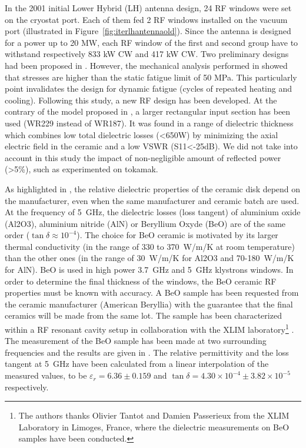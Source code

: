 In the 2001 initial Lower Hybrid (LH) antenna design, 24 RF windows were set on the cryostat port. Each of them fed 2 RF windows installed on the vacuum port (illustrated in Figure~\ref{fig:iterlhantennaold}). Since the antenna is designed for a power up to 20 MW, each RF window of the first and second group have to withstand respectively 833 kW CW and 417 kW CW. Two preliminary designs had been proposed in . However, the mechanical analysis performed in  showed that stresses are higher than the static fatigue limit of 50 MPa. This particularly point invalidates the design for dynamic fatigue (cycles of repeated heating and cooling). Following this study, a new RF design has been developed. At the contrary of the model proposed in \cite{bibet2001-1}, a larger rectangular input section has been used (WR229 instead of WR187). It was found in  a range of dielectric thickness which combines low total dielectric losses (<650W) by minimizing the axial electric field in the ceramic and a low VSWR (S11<-25dB). We did not take into account in this study the impact of non-negligible amount of reflected power (>5\%), such as experimented on tokamak.

As highlighted in , the relative dielectric properties of the ceramic disk depend on the manufacturer, even when the same manufacturer and ceramic batch are used. At the frequency of 5~GHz, the dielectric losses (loss tangent) of aluminium oxide (Al2O3), aluminium nitride (AlN) or Beryllium Oxyde (BeO) are of the same order ($\tan\delta \approx 10^{-4}$). The choice for BeO ceramic is motivated by its larger thermal conductivity (in the range of 330 to 370~\si{W/m/K} at room temperature) than the other ones (in the range of 30~\si{W/m/K} for Al2O3 and 70-180~\si{W/m/K} for AlN). BeO is used in high power 3.7~GHz and 5~GHz klystrons windows. In order to determine the final thickness of the windows, the BeO ceramic RF properties must be known with accuracy. A BeO sample has been requested from the ceramic manufacturer (American Beryllia) with the guarantee that the final ceramics will be made from the same lot. The sample has been characterized within a RF resonant cavity setup in collaboration with the XLIM laboratory\footnote{The authors thanks Olivier Tantot and Damien Passerieux from the XLIM Laboratory in Limoges, France, where the dielectric measurements on BeO samples have been conducted.} . The measurement of the BeO sample has been made at two surrounding frequencies and the results are given in . The relative permittivity and the loss tangent at 5~GHz have been calculated from a linear interpolation of the measured values, to be $\varepsilon_{r}=6.36\pm0.159$ and $\tan \delta = 4.30\times 10^{-4}\pm3.82\times 10^{-5}$ respectively. 

